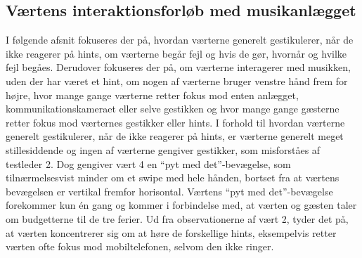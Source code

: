 \subsection{Værtens interaktionsforløb med musikanlægget}
\label{TestresultaterSocialAcceptVaertsGestikker}
%
I følgende afsnit fokuseres der på, hvordan værterne generelt gestikulerer, når de ikke reagerer på hints, om værterne begår fejl og hvis de gør, hvornår og hvilke fejl begåes. Derudover fokuseres der på, om værterne interagerer med musikken, uden der har været et hint, om nogen af værterne bruger venstre hånd frem for højre, hvor mange gange værterne retter fokus mod enten anlægget, kommunikationskameraet eller selve gestikken og hvor mange gange gæsterne retter fokus mod værternes gestikker eller hints.\blankline
%
I forhold til hvordan værterne generelt gestikulerer, når de ikke reagerer på hints, er værterne generelt meget stillesiddende og ingen af værterne gengiver gestikker, som misforståes af testleder 2. Dog gengiver vært 4 en \enquote{pyt med det}-bevægelse, som tilnærmelsesvist minder om et swipe med hele hånden, bortset fra at værtens bevægelsen er vertikal fremfor horisontal. Værtens \enquote{pyt med det}-bevægelse forekommer kun én gang og kommer i forbindelse med, at værten og gæsten taler om budgetterne til de tre ferier. Ud fra observationerne af vært 2, tyder det på, at værten koncentrerer sig om at høre de forskellige hints, eksempelvis retter værten ofte fokus mod mobiltelefonen, selvom den ikke ringer.\blankline
%
